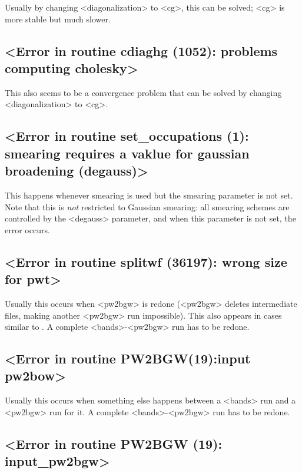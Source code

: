 \documentclass[hyperref, a4paper]{report}
\def\texttt#1{<#1>}%
\newcommand{\shortcode}[1]{\texttt{#1}}
\begin{document}
Usually by changing \shortcode{diagonalization} to \shortcode{cg},
this can be solved; 
\shortcode{cg} is more stable but much slower.

\subsection{\shortcode{Error in routine  cdiaghg (1052):  problems computing cholesky}}

This also seems to be a convergence problem 
that can be solved by changing \shortcode{diagonalization} to \shortcode{cg}.

\subsection{\shortcode{Error in routine  set_occupations (1): smearing requires a vaklue for gaussian broadening (degauss)}}

This happens whenever smearing is used 
but the smearing parameter is not set.
Note that this is \emph{not} restricted to Gaussian smearing:
all smearing schemes are controlled by the \shortcode{degauss} parameter, 
and when this parameter is not set, 
the error occurs.

\subsection{\shortcode{Error in routine  splitwf (36197): wrong size for pwt}}

Usually this occurs when \shortcode{pw2bgw} is redone
(\shortcode{pw2bgw} deletes intermediate files, 
making another \shortcode{pw2bgw} run impossible).
This also appears in cases similar to .
A complete \shortcode{bands}-\shortcode{pw2bgw} run has to be redone.

\subsection{\shortcode{Error in routine PW2BGW(19):input pw2bow}}

Usually this occurs when something else happens between a \shortcode{bands} run 
and a \shortcode{pw2bgw} run for it.
A complete \shortcode{bands}-\shortcode{pw2bgw} run has to be redone.

\subsection{\shortcode{Error in routine PW2BGW (19): input_pw2bgw}}
\end{document}
